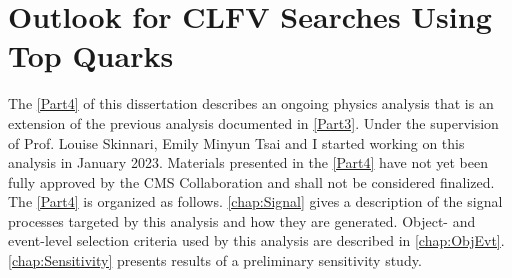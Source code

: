 \part{Outlook for CLFV Searches Using Top Quarks}
\label{Part4}
The \autoref{Part4} of this dissertation describes an ongoing physics analysis that is an extension of the previous analysis documented in \autoref{Part3}. Under the supervision of Prof. Louise Skinnari, Emily Minyun Tsai and I started working on this analysis in January 2023. Materials presented in the \autoref{Part4} have not yet been fully approved by the \ac{CMS} Collaboration and shall not be considered finalized. The \autoref{Part4} is organized as follows. \autoref{chap:Signal} gives a description of the signal processes targeted by this analysis and how they are generated. Object- and event-level selection criteria used by this analysis are described in \autoref{chap:ObjEvt}. \autoref{chap:Sensitivity} presents results of a preliminary sensitivity study.


%

%
